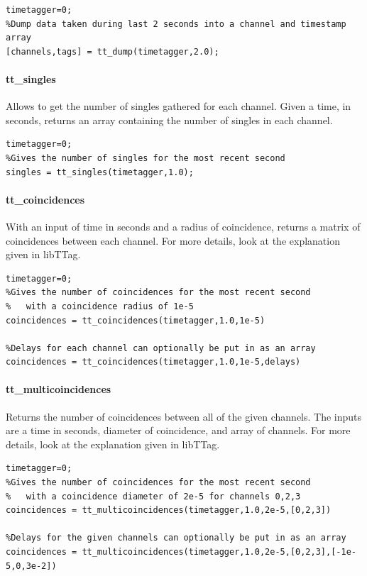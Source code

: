 \documentclass[10pt]{article}
\begin{document}
\begin{verbatim}
timetagger=0;
%Dump data taken during last 2 seconds into a channel and timestamp array
[channels,tags] = tt_dump(timetagger,2.0);
\end{verbatim}

\paragraph{tt\_singles}
Allows to get the number of singles gathered for each channel. Given a time, in seconds,
returns an array containing the number of singles in each channel.

\begin{verbatim}
timetagger=0;
%Gives the number of singles for the most recent second
singles = tt_singles(timetagger,1.0);
\end{verbatim}

\paragraph{tt\_coincidences}
With an input of time in seconds and a radius of coincidence, returns
a matrix of coincidences between each channel. For more details, look
at the explanation given in libTTag.

\begin{verbatim}
timetagger=0;
%Gives the number of coincidences for the most recent second
%   with a coincidence radius of 1e-5
coincidences = tt_coincidences(timetagger,1.0,1e-5)

%Delays for each channel can optionally be put in as an array
coincidences = tt_coincidences(timetagger,1.0,1e-5,delays)
\end{verbatim}

\paragraph{tt\_multicoincidences}
Returns the number of coincidences between all of the given channels.
The inputs are a time in seconds, diameter of coincidence, and array of channels.
For more details, look at the explanation given in libTTag.

\begin{verbatim}
timetagger=0;
%Gives the number of coincidences for the most recent second
%   with a coincidence diameter of 2e-5 for channels 0,2,3
coincidences = tt_multicoincidences(timetagger,1.0,2e-5,[0,2,3])

%Delays for the given channels can optionally be put in as an array
coincidences = tt_multicoincidences(timetagger,1.0,2e-5,[0,2,3],[-1e-5,0,3e-2])
\end{verbatim}
\end{document}
